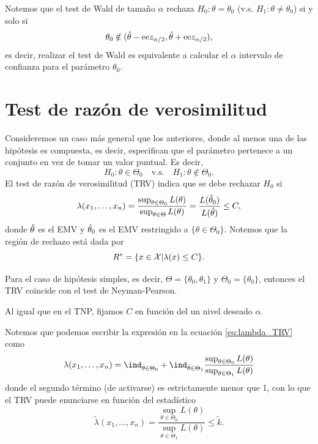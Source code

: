 \begin{remark}
Notemos que el test de Wald de tamaño $\alpha$ rechaza $H_0:\theta=\theta_0$ (v.s. $H_1:\theta\neq\theta_0$) si y solo si 
\begin{equation}
	\theta_0 \notin ({\hat\theta} - {\text{ee}} z_{\alpha/2},{\hat\theta} + {\text{ee}} z_{\alpha/2}),
\end{equation}
es decir, realizar el test de Wald es equivalente a calcular el $\alpha$ intervalo de confianza para el parámetro $\theta_0$.
\end{remark}


\section{Test de razón de verosimilitud} 
\label{sub:test_de_RV}

Consideremos un caso más general que los anteriores, donde al menos una de las hipótesis es compuesta, es decir, especifican que el parámetro pertenece a un conjunto en vez de tomar un valor puntual. Es decir, 
\begin{equation}
		H_0:\theta \in\Theta_0\quad \text{v.s.}\quad H_1:\theta \notin\Theta_0.
	\end{equation}
El test de razón de verosimilitud (TRV) indica que se debe rechazar $H_0$ si 
\begin{equation}
	\label{eq:lambda_TRV}
	\lambda(x_1,\ldots,x_n) = \frac{\sup_{\theta\in\Theta_0}L(\theta)}{\sup_{\theta\in\Theta}L(\theta)}
							= \frac{L({\hat\theta}_0)}{L({\hat\theta})}\leq C,
\end{equation}
donde ${\hat\theta}$ es el EMV y ${\hat\theta}_0$ es el EMV restringido a $\{\theta\in\Theta_0\}$. Notemos que la región de rechazo está dada por 
\begin{equation}
	R^* = \{x\in{\mathcal X}|\lambda(x)\leq C\}.
\end{equation}
\begin{remark}
	Para el caso de hipótesis simples, es decir, $\Theta = \{\theta_0,\theta_1\}$ y $\Theta_0 = \{\theta_0\}$, entonces el TRV coincide con el test de Neyman-Pearson. 
\end{remark}
Al igual que en el TNP, fijamos $C$ en función del un nivel deseado $\alpha$. 

\begin{remark}
	Notemos que podemos escribir la expresión en la ecuación \eqref{eq:lambda_TRV} como 
	\begin{equation}
		\lambda(x_1,\ldots,x_n) =  \ind_{\thetahat\in\Theta_0} + \ind_{\thetahat\in\Theta_1} \frac{\sup_{\theta\in\Theta_0}L(\theta)}{\sup_{\theta\in\Theta_1}L(\theta)}
	\end{equation}
	donde el segundo término (de activarse) es estrictamente menor que 1, con lo que el TRV puede enunciarse en función del estadístico 
	\begin{equation}
		\tilde{\lambda}(x_1,\ldots,x_n) = \frac{\sup_{\theta\in\Theta_0}L(\theta)}{\sup_{\theta\in\Theta_1}L(\theta)} \leq \tilde{k}.
	\end{equation}
\end{remark}


